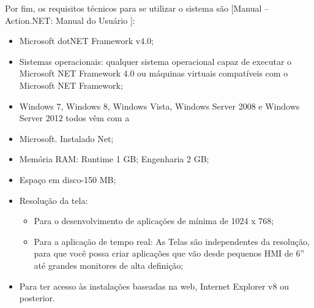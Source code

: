 Por fim, os requisitos técnicos para se utilizar o sistema são [Manual – Action.NET: Manual do Usuário ]:
\begin{itemize}
\item Microsoft dotNET Framework v4.0;
\item Sistemas operacionais: qualquer sistema operacional capaz de executar o Microsoft NET Framework 4.0 ou máquinas virtuais compatíveis com o Microsoft NET Framework;
\item Windows 7, Windows 8, Windows Vista, Windows Server 2008 e Windows Server 2012 todos vêm com a \item Microsoft. Instalado Net;
\item Memória RAM: Runtime 1 GB; Engenharia 2 GB;
\item Espaço em disco-150 MB;
\item Resolução da tela:
	\begin{itemize}
	\item Para o desenvolvimento de aplicações de mínima de 1024 x 768;
	\item Para a aplicação de tempo real: As Telas são independentes da resolução, para que você possa criar aplicações que vão desde pequenos HMI de 6” até grandes monitores de alta definição;
	\end{itemize}
\item Para ter acesso às instalações baseadas na web, Internet Explorer v8 ou posterior.
\end{itemize}